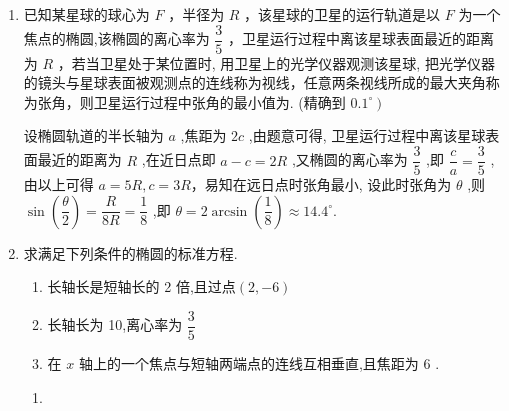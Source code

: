 \begin{enumerate}
\begin{jieda}
    \end{jieda}
    \item 已知某星球的球心为 $F$ ，半径为 $R$ ，该星球的卫星的运行轨道是以 $F$ 为一个焦点的椭圆,该椭圆的离心率为 $\dfrac{3}{5}$ ，卫星运行过程中离该星球表面最近的距离为 $R$ ，若当卫星处于某位置时, 用卫星上的光学仪器观测该星球, 把光学仪器的镜头与星球表面被观测点的连线称为视线，任意两条视线所成的最大夹角称为张角，则卫星运行过程中张角的最小值为. (精确到 $\left. {0.{1}^{ \circ  }}\right)$
    \begin{jieda}
        设椭圆轨道的半长轴为 $a$ ,焦距为 ${2c}$ ,由题意可得, 卫星运行过程中离该星球表面最近的距离为 $R$ ,在近日点即 $a - c = {2R}$ ,又椭圆的离心率为 $\dfrac{3}{5}$ ,即 $\dfrac{c}{a} = \dfrac{3}{5}$ ,由以上可得 $a = {5R},c = {3R}$，易知在远日点时张角最小, 设此时张角为 $\theta$ ,则 $\sin \left( \dfrac{\theta }{2}\right)  = \dfrac{R}{8R} = \dfrac{1}{8}$ ,即 $\theta  = 2\arcsin \left( \dfrac{1}{8}\right)  \approx {14.4}^{ \circ}$. 
    \end{jieda}
    \item 求满足下列条件的椭圆的标准方程.
    \begin{enumerate}
        \item 长轴长是短轴长的 2 倍,且过点$(2, - 6)$
        \item 长轴长为 10,离心率为 $\dfrac{3}{5}$
        \item 在 $x$ 轴上的一个焦点与短轴两端点的连线互相垂直,且焦距为 6 .
    \end{enumerate}
    \begin{jieda}
        \begin{enumerate}
            \item 

\end{enumerate}
\end{jieda}
\end{enumerate}
